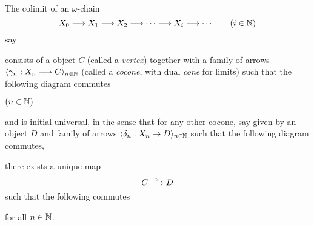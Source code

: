 \begin{definition}
The colimit of an $\omega$-chain
\[
    X_0 \longrightarrow X_1 \longrightarrow X_2 \longrightarrow \cdots \longrightarrow X_i
    \longrightarrow \cdots
    \qquad(i\in\mathbb{N})
\]
say
\begin{center}
\end{center}
consists of a object $C$ (called a \emph{vertex}) together with a family of
arrows $\langle \gamma_n : X_n \longrightarrow C \rangle _{n \in \mathbb{N}}$ (called a
\emph{cocone}, with dual \emph{cone} for limits) such that the following
diagram commutes 
\begin{center}
\qquad$(n \in \mathbb{N})$
\end{center}
and is initial universal, in the sense that for any other cocone, say given by
an object $D$ and family of arrows $\langle \delta_n : X_n \rightarrow
D\rangle_{n \in \mathbb{N}}$ such that the following diagram commutes,
\begin{center}
\end{center}
there exists a unique map
\[
    C \overset{u}{\longrightarrow} D
\]
such that the following commutes 
\begin{center}
\end{center}
for all $n \in \mathbb{N}$.
\end{definition}


